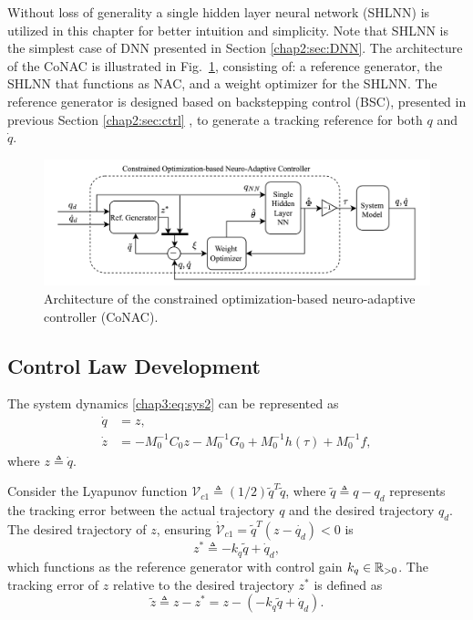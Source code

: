 Without loss of generality a single hidden layer neural network (SHLNN) is utilized in this chapter for better intuition and simplicity. 
Note that SHLNN is the simplest case of DNN presented in Section \ref{chap2:sec:DNN}.
The architecture of the CoNAC is illustrated in Fig.~\ref{chap3:fig:ctrl}, consisting of: a reference generator, the SHLNN that functions as NAC, and a weight optimizer for the SHLNN. 
The reference generator is designed based on backstepping control (BSC), presented in previous Section \ref{chap2:sec:ctrl} , to generate a tracking reference for both $q$ and $\dot q$.

\begin{figure}[t]
    \centering
    \includegraphics[width=0.9\linewidth]{imgs/ControllerChap3.drawio.png}
    \caption{Architecture of the constrained optimization-based neuro-adaptive controller (CoNAC).}
    \label{chap3:fig:ctrl}
\end{figure}

\subsection{Control Law Development} \label{chap3:sec:ctrl_dev}

The system dynamics \eqref{chap3:eq:sys2} can be represented as
\begin{equation}
    \begin{aligned}
        \dot {q} &= {z},\\
        \dot {z} &= -M_0^{-1} C_0 {z}-M_0^{-1} G_0+M_0^{-1} h(\tau) + M_0^{-1} f,
    \end{aligned}
    \label{chap3:eq:x_dyna}
\end{equation}
where ${z}\triangleq \dot q$.

Consider the Lyapunov function ${\mathcal V}_{c1}\triangleq(1/2){\tilde q}^T  {\tilde q}$, where ${\tilde q}\triangleq {q}-{q_d}$ represents the tracking error between the actual trajectory ${q}$ and the desired trajectory $q_d$. 
The desired trajectory of ${z}$, ensuring $\dot {\mathcal V}_{c1}={\tilde q}^T  ({z}-\dot {q_d})<0$ is 
\begin{equation}
    {z^*} \triangleq -{k_q}{\tilde q} + \dot q_d,
\end{equation}
which functions as the reference generator with control gain ${k_q} \in\mathbb{R}_{>0}$. The tracking error of ${z}$ relative to the desired trajectory ${z^*}$ is defined as
\begin{equation}
    {\tilde z} \triangleq {z} - {z^*} = {z} - (-{k_q}{\tilde q} + \dot q_d).
    \label{chap3:eq:e2}
\end{equation}

